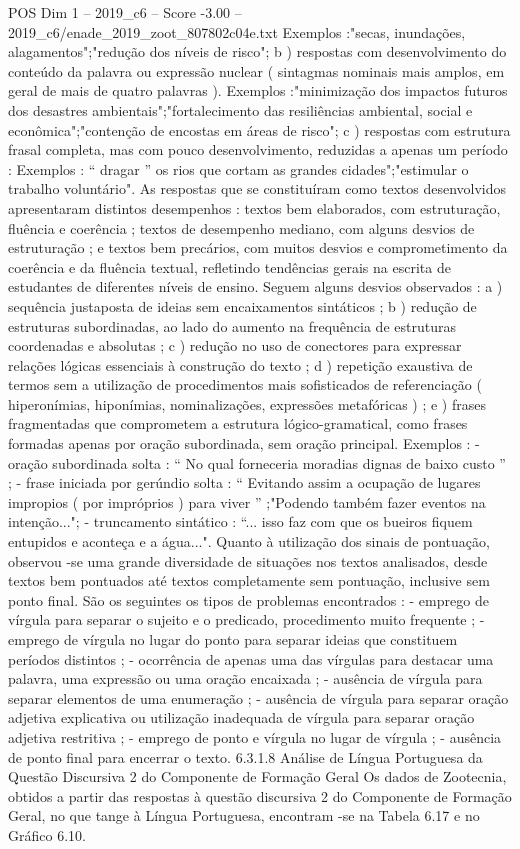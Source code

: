 \begin{textsample}{POS Dim 1 – 2019\_c6 – Score -3.00 – 2019\_c6/enade\_2019\_zoot\_807802c04e.txt}
Exemplos :"secas, inundações, alagamentos";"redução dos níveis de risco"; b ) respostas com desenvolvimento do conteúdo da palavra ou expressão nuclear ( sintagmas nominais mais amplos, em geral de mais de quatro palavras ).
Exemplos :"minimização dos impactos futuros dos desastres ambientais";"fortalecimento das resiliências ambiental, social e econômica";"contenção de encostas em áreas de risco"; c ) respostas com estrutura frasal completa, mas com pouco desenvolvimento, reduzidas a apenas um período : Exemplos : “ dragar ” os rios que cortam as grandes cidades";"estimular o trabalho voluntário".
As respostas que se constituíram como textos desenvolvidos apresentaram distintos desempenhos : textos bem elaborados, com estruturação, fluência e coerência ; textos de desempenho mediano, com alguns desvios de estruturação ; e textos bem precários, com muitos desvios e comprometimento da coerência e da fluência textual, refletindo tendências gerais na escrita de estudantes de diferentes níveis de ensino.
Seguem alguns desvios observados : a ) sequência justaposta de ideias sem encaixamentos sintáticos ; b ) redução de estruturas subordinadas, ao lado do aumento na frequência de estruturas coordenadas e absolutas ; c ) redução no uso de conectores para expressar relações lógicas essenciais à construção do texto ; d ) repetição exaustiva de termos sem a utilização de procedimentos mais sofisticados de referenciação ( hiperonímias, hiponímias, nominalizações, expressões metafóricas ) ; e ) frases fragmentadas que comprometem a estrutura lógico-gramatical, como frases formadas apenas por oração subordinada, sem oração principal.
Exemplos : - oração subordinada solta : “ No qual forneceria moradias dignas de baixo custo ” ; - frase iniciada por gerúndio solta : “ Evitando assim a ocupação de lugares impropios ( por impróprios ) para viver ” ;"Podendo também fazer eventos na intenção..."; - truncamento sintático : “... isso faz com que os bueiros fiquem entupidos e aconteça e a água...".
Quanto à utilização dos sinais de pontuação, observou -se uma grande diversidade de situações nos textos analisados, desde textos bem pontuados até textos completamente sem pontuação, inclusive sem ponto final.
São os seguintes os tipos de problemas encontrados : - emprego de vírgula para separar o sujeito e o predicado, procedimento muito frequente ; - emprego de vírgula no lugar do ponto para separar ideias que constituem períodos distintos ; - ocorrência de apenas uma das vírgulas para destacar uma palavra, uma expressão ou uma oração encaixada ; - ausência de vírgula para separar elementos de uma enumeração ; - ausência de vírgula para separar oração adjetiva explicativa ou utilização inadequada de vírgula para separar oração adjetiva restritiva ; - emprego de ponto e vírgula no lugar de vírgula ; - ausência de ponto final para encerrar o texto. 6.3.1.8 Análise de Língua Portuguesa da Questão Discursiva 2 do Componente de Formação Geral Os dados de Zootecnia, obtidos a partir das respostas à questão discursiva 2 do Componente de Formação Geral, no que tange à Língua Portuguesa, encontram -se na Tabela 6.17 e no Gráfico 6.10.

\end{textsample}
